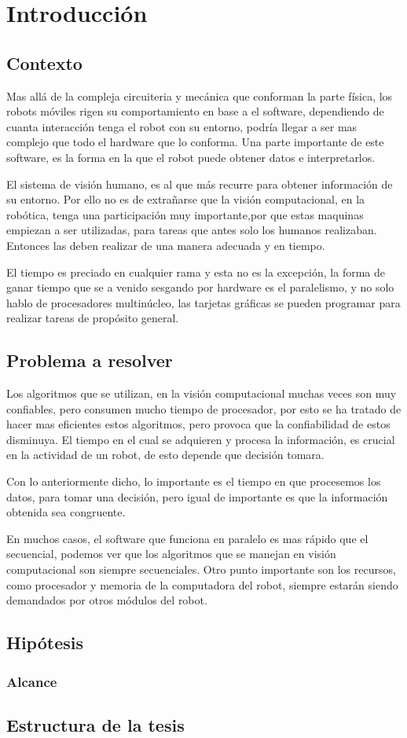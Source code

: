 \chapter{Introducción}

\section{Contexto}
Mas allá de la compleja circuiteria y mecánica que conforman la parte física, los robots móviles rigen su comportamiento en base a el software, dependiendo de cuanta interacción tenga el robot con su entorno, podría llegar a ser mas complejo que todo el hardware que lo conforma. Una parte importante de este software, es la forma en la que el robot puede obtener datos e interpretarlos. 

El sistema de visión humano, es al que más recurre para obtener información de su entorno. Por ello no es de extrañarse que la visión computacional, en la robótica, tenga una participación muy importante,por que estas maquinas empiezan a ser utilizadas, para tareas que antes solo los humanos realizaban. Entonces las deben realizar de una manera adecuada y en tiempo. 

El tiempo es preciado en cualquier rama y esta no es la excepción, la forma de ganar tiempo que se a venido sesgando por hardware es el paralelismo, y no solo hablo de procesadores multinúcleo, las tarjetas gráficas se pueden programar para realizar tareas de propósito general.   

\section{Problema a resolver}
Los algoritmos que se utilizan, en la visión computacional muchas veces son muy confiables, pero consumen mucho tiempo de procesador, por esto se ha tratado de hacer mas eficientes estos algoritmos, pero provoca que  la confiabilidad de estos disminuya. El tiempo en el cual se adquieren y procesa la información, es crucial en la actividad de un robot, de esto depende que decisión tomara.

Con lo anteriormente dicho, lo importante es el tiempo en que procesemos los datos, para tomar una decisión, pero igual de importante es que la información obtenida sea congruente. 

En muchos casos, el software que funciona en paralelo es mas rápido que el secuencial, podemos ver que los algoritmos que se manejan en visión computacional son siempre secuenciales. Otro punto importante son los recursos, como procesador y memoria de la computadora del robot, siempre estarán siendo demandados por otros módulos del robot.    

\section{Hipótesis} 



\subsection{Alcance}

\section{Estructura de la tesis}
